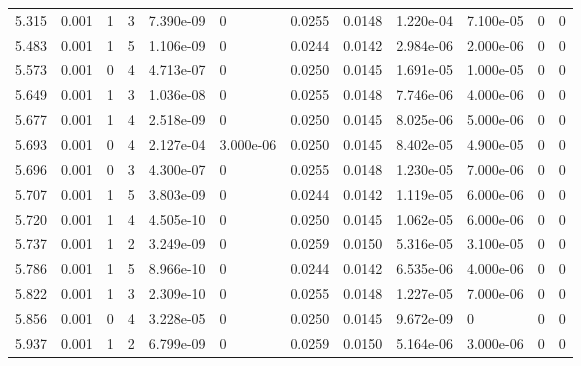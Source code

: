 \documentclass[preview]{standalone}
\begin{document}
{{{{\begin{tabular}{L{1.2cm}C{1.2cm} C{0.3cm}C{0.5cm} C{1.4cm}C{1.4cm} C{1.4cm}C{1.4cm} C{1.6cm}C{1.6cm} C{1.6cm}C{1.6cm}}
  5.315  &  0.001  & 1     &  3 &  7.390e-09  & 0  &  0.0255&   0.0148& 1.220e-04 & 7.100e-05   &  0 & 0  \\ 
  5.483  &  0.001  & 1     &  5 &  1.106e-09  & 0  &  0.0244&   0.0142& 2.984e-06 & 2.000e-06   &  0 & 0  \\ 
  5.573  &  0.001  & 0     &  4 &  4.713e-07  & 0  &  0.0250&   0.0145& 1.691e-05 & 1.000e-05   &  0 & 0  \\ 
  5.649  &  0.001  & 1     &  3 &  1.036e-08  & 0  &  0.0255&   0.0148& 7.746e-06 & 4.000e-06   &  0 & 0  \\ 
  5.677  &  0.001  & 1     &  4 &  2.518e-09  & 0  &  0.0250&   0.0145& 8.025e-06 & 5.000e-06   &  0 & 0  \\ 
  5.693  &  0.001  & 0     &  4 &  2.127e-04  & 3.000e-06  &  0.0250&   0.0145& 8.402e-05 & 4.900e-05   &  0 & 0  \\ 
  5.696  &  0.001  & 0     &  3 &  4.300e-07  & 0  &  0.0255&   0.0148& 1.230e-05 & 7.000e-06   &  0 & 0  \\ 
  5.707  &  0.001  & 1     &  5 &  3.803e-09  & 0  &  0.0244&   0.0142& 1.119e-05 & 6.000e-06   &  0 & 0  \\ 
  5.720  &  0.001  & 1     &  4 &  4.505e-10  & 0  &  0.0250&   0.0145& 1.062e-05 & 6.000e-06   &  0 & 0  \\ 
  5.737  &  0.001  & 1     &  2 &  3.249e-09  & 0  &  0.0259&   0.0150& 5.316e-05 & 3.100e-05   &  0 & 0  \\ 
  5.786  &  0.001  & 1     &  5 &  8.966e-10  & 0  &  0.0244&   0.0142& 6.535e-06 & 4.000e-06   &  0 & 0  \\ 
  5.822  &  0.001  & 1     &  3 &  2.309e-10  & 0  &  0.0255&   0.0148& 1.227e-05 & 7.000e-06   &  0 & 0  \\ 
  5.856  &  0.001  & 0     &  4 &  3.228e-05  & 0  &  0.0250&   0.0145& 9.672e-09 & 0   &  0 & 0  \\ 
  5.937  &  0.001  & 1     &  2 &  6.799e-09  & 0  &  0.0259&   0.0150& 5.164e-06 & 3.000e-06   &  0 & 0  \\ 
\hline 
\end{tabular} 

}}}}
\end{document}

